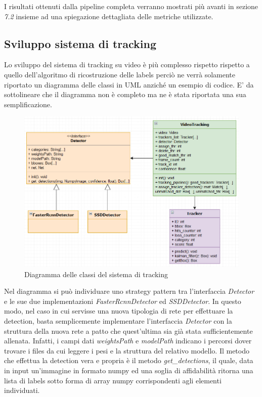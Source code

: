 I risultati ottenuti dalla pipeline completa verranno mostrati più avanti in sezione \textit{7.2} insieme ad una spiegazione dettagliata delle metriche utilizzate.

\newpage
\subsection{Sviluppo sistema di tracking}
Lo sviluppo del sistema di tracking su video è più complesso rispetto rispetto a quello dell'algoritmo di ricostruzione delle labels perciò ne verrà solamente riportato un diagramma delle classi in UML anziché un esempio di codice. E' da sottolineare che il diagramma non è completo ma ne è stata riportata una sua semplificazione.
\begin{figure}[H]
	\centering
	\includegraphics[width=0.9\linewidth]{images/diagramma-classi-tracking.png}
	\caption{Diagramma delle classi del sistema di tracking}
	\label{Diagramma delle classi del sistema di tracking}
\end{figure}
Nel diagramma si può individuare uno strategy pattern tra l'interfaccia \textit{Detector} e le sue due implementazioni \textit{FasterRcnnDetector} ed \textit{SSDDetector}. In questo modo, nel caso in cui servisse una nuova tipologia di rete per effettuare la detection, basta semplicemente implementare l'interfaccia \textit{Detector} con la struttura della nuova rete a patto che quest'ultima sia già stata sufficientemente allenata. Infatti, i campi dati \textit{weightsPath} e \textit{modelPath} indicano i percorsi dover trovare i files da cui leggere i pesi e la struttura del relativo modello. Il metodo che effettua la detection vera e propria è il metodo \textit{get\_detections}, il quale, data in input un'immagine in formato numpy ed una soglia di affidabilità ritorna una lista di labels sotto forma di array numpy corrispondenti agli elementi individuati.\\

